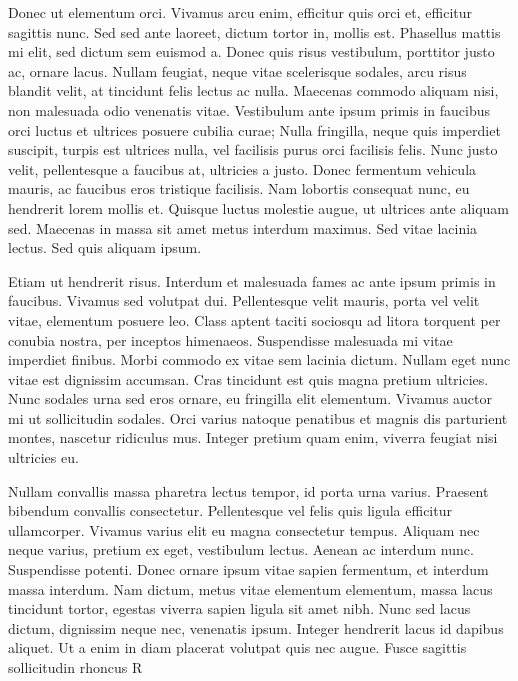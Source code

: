 Donec ut elementum orci. Vivamus arcu enim, efficitur quis orci et, efficitur sagittis nunc. Sed sed ante laoreet, dictum tortor in, mollis est. Phasellus mattis mi elit, sed dictum sem euismod a. Donec quis risus vestibulum, porttitor justo ac, ornare lacus. Nullam feugiat, neque vitae scelerisque sodales, arcu risus blandit velit, at tincidunt felis lectus ac nulla. Maecenas commodo aliquam nisi, non malesuada odio venenatis vitae. Vestibulum ante ipsum primis in faucibus orci luctus et ultrices posuere cubilia curae; Nulla fringilla, neque quis imperdiet suscipit, turpis est ultrices nulla, vel facilisis purus orci facilisis felis. Nunc justo velit, pellentesque a faucibus at, ultricies a justo. Donec fermentum vehicula mauris, ac faucibus eros tristique facilisis. Nam lobortis consequat nunc, eu hendrerit lorem mollis et. Quisque luctus molestie augue, ut ultrices ante aliquam sed. Maecenas in massa sit amet metus interdum maximus. Sed vitae lacinia lectus. Sed quis aliquam ipsum.

Etiam ut hendrerit risus. Interdum et malesuada fames ac ante ipsum primis in faucibus. Vivamus sed volutpat dui. Pellentesque velit mauris, porta vel velit vitae, elementum posuere leo. Class aptent taciti sociosqu ad litora torquent per conubia nostra, per inceptos himenaeos. Suspendisse malesuada mi vitae imperdiet finibus. Morbi commodo ex vitae sem lacinia dictum. Nullam eget nunc vitae est dignissim accumsan. Cras tincidunt est quis magna pretium ultricies. Nunc sodales urna sed eros ornare, eu fringilla elit elementum. Vivamus auctor mi ut sollicitudin sodales. Orci varius natoque penatibus et magnis dis parturient montes, nascetur ridiculus mus. Integer pretium quam enim, viverra feugiat nisi ultricies eu.

Nullam convallis massa pharetra lectus tempor, id porta urna varius. Praesent bibendum convallis consectetur. Pellentesque vel felis quis ligula efficitur ullamcorper. Vivamus varius elit eu magna consectetur tempus. Aliquam nec neque varius, pretium ex eget, vestibulum lectus. Aenean ac interdum nunc. Suspendisse potenti. Donec ornare ipsum vitae sapien fermentum, et interdum massa interdum. Nam dictum, metus vitae elementum elementum, massa lacus tincidunt tortor, egestas viverra sapien ligula sit amet nibh. Nunc sed lacus dictum, dignissim neque nec, venenatis ipsum. Integer hendrerit lacus id dapibus aliquet. Ut a enim in diam placerat volutpat quis nec augue. Fusce sagittis sollicitudin rhoncus
\vfill
\supereject
\if R\lr \null\vfill\eject\fi


\bye
